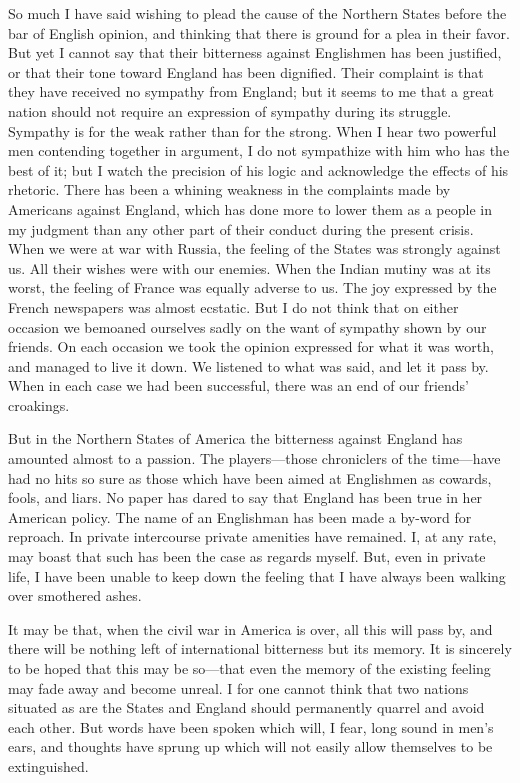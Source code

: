 So much I have said wishing to plead the cause of the Northern
States before the bar of English opinion, and thinking that there
is ground for a plea in their favor.  But yet I cannot say that
their bitterness against Englishmen has been justified, or that
their tone toward England has been dignified.  Their complaint is
that they have received no sympathy from England; but it seems to
me that a great nation should not require an expression of sympathy
during its struggle.  Sympathy is for the weak rather than for the
strong.  When I hear two powerful men contending together in
argument, I do not sympathize with him who has the best of it; but
I watch the precision of his logic and acknowledge the effects of
his rhetoric.  There has been a whining weakness in the complaints
made by Americans against England, which has done more to lower
them as a people in my judgment than any other part of their
conduct during the present crisis.  When we were at war with
Russia, the feeling of the States was strongly against us.  All
their wishes were with our enemies.  When the Indian mutiny was at
its worst, the feeling of France was equally adverse to us.  The
joy expressed by the French newspapers was almost ecstatic.  But I
do not think that on either occasion we bemoaned ourselves sadly on
the want of sympathy shown by our friends.  On each occasion we
took the opinion expressed for what it was worth, and managed to
live it down.  We listened to what was said, and let it pass by.
When in each case we had been successful, there was an end of our
friends' croakings.

But in the Northern States of America the bitterness against
England has amounted almost to a passion.  The players---those
chroniclers of the time---have had no hits so sure as those which
have been aimed at Englishmen as cowards, fools, and liars.  No
paper has dared to say that England has been true in her American
policy.  The name of an Englishman has been made a by-word for
reproach.  In private intercourse private amenities have remained.
I, at any rate, may boast that such has been the case as regards
myself.  But, even in private life, I have been unable to keep down
the feeling that I have always been walking over smothered ashes.

It may be that, when the civil war in America is over, all this
will pass by, and there will be nothing left of international
bitterness but its memory.  It is sincerely to be hoped that this
may be so---that even the memory of the existing feeling may fade
away and become unreal.  I for one cannot think that two nations
situated as are the States and England should permanently quarrel
and avoid each other.  But words have been spoken which will, I
fear, long sound in men's ears, and thoughts have sprung up which
will not easily allow themselves to be extinguished.



